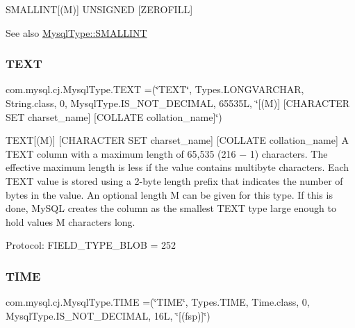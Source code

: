 S\+M\+A\+L\+L\+I\+NT\mbox{[}(M)\mbox{]} U\+N\+S\+I\+G\+N\+ED \mbox{[}Z\+E\+R\+O\+F\+I\+LL\mbox{]}

\begin{DoxySeeAlso}{See also}
\mbox{\hyperlink{enumcom_1_1mysql_1_1cj_1_1_mysql_type_a6f47bd8cc33374c77f4af4d1b9758081}{Mysql\+Type\+::\+S\+M\+A\+L\+L\+I\+NT}} 
\end{DoxySeeAlso}
\mbox{\label{enumcom_1_1mysql_1_1cj_1_1_mysql_type_af97147cd8d895153093d3ba21bf44007}} 
\subsubsection{\texorpdfstring{T\+E\+XT}{TEXT}}
{\footnotesize\ttfamily com.\+mysql.\+cj.\+Mysql\+Type.\+T\+E\+XT =(\char`\"{}T\+E\+XT\char`\"{}, Types.\+L\+O\+N\+G\+V\+A\+R\+C\+H\+AR, String.\+class, 0, Mysql\+Type.\+I\+S\+\_\+\+N\+O\+T\+\_\+\+D\+E\+C\+I\+M\+AL, 65535\+L, \char`\"{}\mbox{[}(\+M)\mbox{]} \mbox{[}\+C\+H\+A\+R\+A\+C\+T\+E\+R S\+E\+T charset\+\_\+name\mbox{]} \mbox{[}\+C\+O\+L\+L\+A\+T\+E collation\+\_\+name\mbox{]}\char`\"{})}

T\+E\+XT\mbox{[}(M)\mbox{]} \mbox{[}C\+H\+A\+R\+A\+C\+T\+ER S\+ET charset\+\_\+name\mbox{]} \mbox{[}C\+O\+L\+L\+A\+TE collation\+\_\+name\mbox{]} A T\+E\+XT column with a maximum length of 65,535 (216 − 1) characters. The effective maximum length is less if the value contains multibyte characters. Each T\+E\+XT value is stored using a 2-\/byte length prefix that indicates the number of bytes in the value. An optional length M can be given for this type. If this is done, My\+S\+QL creates the column as the smallest T\+E\+XT type large enough to hold values M characters long.

Protocol\+: F\+I\+E\+L\+D\+\_\+\+T\+Y\+P\+E\+\_\+\+B\+L\+OB = 252 \mbox{\label{enumcom_1_1mysql_1_1cj_1_1_mysql_type_a4f40234bb514d5564a25a6585bd8ab36}} 
\subsubsection{\texorpdfstring{T\+I\+ME}{TIME}}
{\footnotesize\ttfamily com.\+mysql.\+cj.\+Mysql\+Type.\+T\+I\+ME =(\char`\"{}T\+I\+ME\char`\"{}, Types.\+T\+I\+ME, Time.\+class, 0, Mysql\+Type.\+I\+S\+\_\+\+N\+O\+T\+\_\+\+D\+E\+C\+I\+M\+AL, 16\+L, \char`\"{}\mbox{[}(fsp)\mbox{]}\char`\"{})}

